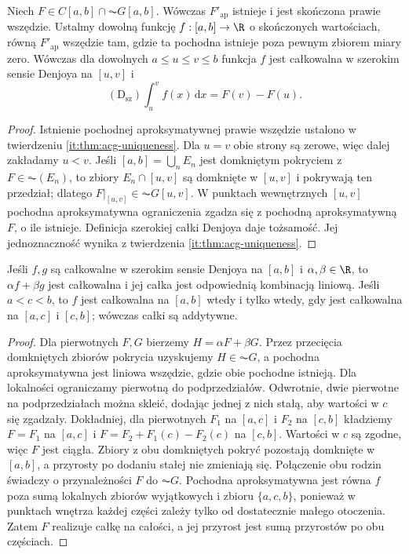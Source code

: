 \begin{twierdzenie}\label{tw:denjoy-szeroka-ftc}
Niech $F\in C[a,b]\cap\AC G[a,b]$. Wówczas $F'_{\mathrm{ap}}$ istnieje i jest skończona prawie wszędzie. Ustalmy dowolną funkcję $f:[a,b]\to\R$ o skończonych wartościach, równą $F'_{\mathrm{ap}}$ wszędzie tam, gdzie ta pochodna istnieje poza pewnym zbiorem miary zero. Wówczas dla dowolnych $a\le u\le v\le b$ funkcja $f$ jest całkowalna w szerokim sensie Denjoya na $[u,v]$ i
\[
 (\mathrm D_{\mathrm{sz}})\int_u^v f(x)\,\mathrm dx=F(v)-F(u).
\]
\end{twierdzenie}
\begin{proof}
Istnienie pochodnej aproksymatywnej prawie wszędzie ustalono w twierdzeniu \ref{it:thm:acg-uniqueness}. Dla $u=v$ obie strony są zerowe, więc dalej zakładamy $u<v$. Jeśli $[a,b]=\bigcup_n E_n$ jest domkniętym pokryciem z $F\in\AC(E_n)$, to zbiory $E_n\cap[u,v]$ są domknięte w $[u,v]$ i pokrywają ten przedział; dlatego $F|_{[u,v]}\in\AC G[u,v]$. W punktach wewnętrznych $[u,v]$ pochodna aproksymatywna ograniczenia zgadza się z pochodną aproksymatywną $F$, o ile istnieje. Definicja szerokiej całki Denjoya daje tożsamość. Jej jednoznaczność wynika z twierdzenia \ref{it:thm:acg-uniqueness}.
\end{proof}
\begin{stwierdzenie}\label{st:denjoy-szeroka-lokalnosc}
Jeśli $f,g$ są całkowalne w szerokim sensie Denjoya na $[a,b]$ i $\alpha,\beta\in\R$, to $\alpha f+\beta g$ jest całkowalna i jej całka jest odpowiednią kombinacją liniową. Jeśli $a<c<b$, to $f$ jest całkowalna na $[a,b]$ wtedy i tylko wtedy, gdy jest całkowalna na $[a,c]$ i $[c,b]$; wówczas całki są addytywne.
\end{stwierdzenie}
\begin{proof}
Dla pierwotnych $F,G$ bierzemy $H=\alpha F+\beta G$. Przez przecięcia domkniętych zbiorów pokrycia uzyskujemy $H\in\AC G$, a pochodna aproksymatywna jest liniowa wszędzie, gdzie obie pochodne istnieją. Dla lokalności ograniczamy pierwotną do podprzedziałów. Odwrotnie, dwie pierwotne na podprzedziałach można skleić, dodając jednej z nich stałą, aby wartości w $c$ się zgadzały. Dokładniej, dla pierwotnych $F_1$ na $[a,c]$ i $F_2$ na $[c,b]$ kładziemy $F=F_1$ na $[a,c]$ i $F=F_2+F_1(c)-F_2(c)$ na $[c,b]$. Wartości w $c$ są zgodne, więc $F$ jest ciągła. Zbiory z obu domkniętych pokryć pozostają domknięte w $[a,b]$, a przyrosty po dodaniu stałej nie zmieniają się. Połączenie obu rodzin świadczy o przynależności $F$ do $\AC G$. Pochodna aproksymatywna jest równa $f$ poza sumą lokalnych zbiorów wyjątkowych i zbioru $\{a,c,b\}$, ponieważ w punktach wnętrza każdej części zależy tylko od dostatecznie małego otoczenia. Zatem $F$ realizuje całkę na całości, a jej przyrost jest sumą przyrostów po obu częściach.
\end{proof}
